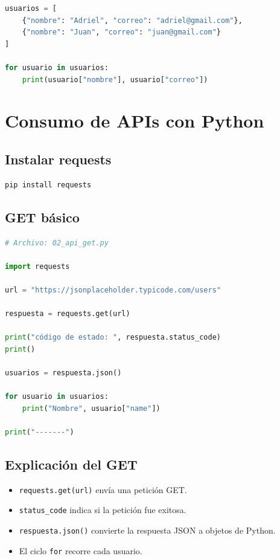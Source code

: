 \documentclass[12pt]{article}
\begin{document}
\begin{lstlisting}[language=Python]
usuarios = [
    {"nombre": "Adriel", "correo": "adriel@gmail.com"},
    {"nombre": "Juan", "correo": "juan@gmail.com"}
]

for usuario in usuarios:
    print(usuario["nombre"], usuario["correo"])
\end{lstlisting}

\section{Consumo de APIs con Python}

\subsection{Instalar requests}

\begin{lstlisting}
pip install requests
\end{lstlisting}

\subsection{GET básico}

\begin{lstlisting}[language=Python]
# Archivo: 02_api_get.py

import requests 

url = "https://jsonplaceholder.typicode.com/users"

respuesta = requests.get(url)

print("código de estado: ", respuesta.status_code)
print()

usuarios = respuesta.json()

for usuario in usuarios:
    print("Nombre", usuario["name"])

print("-------")
\end{lstlisting}

\subsection{Explicación del GET}

\begin{itemize}
    \item \texttt{requests.get(url)} envía una petición GET.
    \item \texttt{status\_code} indica si la petición fue exitosa.
    \item \texttt{respuesta.json()} convierte la respuesta JSON a objetos de Python.
    \item El ciclo \texttt{for} recorre cada usuario.
\end{itemize}
\end{document}
